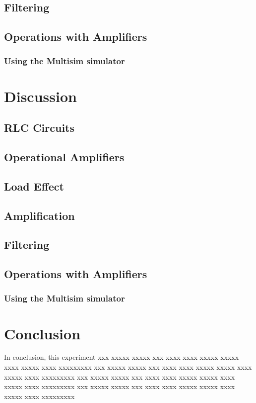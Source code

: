 \documentclass[12pt]{article}
\begin{document}
        \subsection{Filtering}
        \subsection{Operations with Amplifiers}
            \subsubsection{Using the Multisim simulator}


    \section{Discussion}
        \subsection{RLC Circuits}
        \subsection{Operational Amplifiers}
        \subsection{Load Effect}
        \subsection{Amplification}
        \subsection{Filtering}
        \subsection{Operations with Amplifiers}
            \subsubsection{Using the Multisim simulator}
    
    \section{Conclusion}
    In conclusion, this experiment 
    xxx xxxxx xxxxx xxx xxxx xxxx xxxxx xxxxx xxxx xxxxx xxxx
    xxxxxxxxx xxx xxxxx xxxxx xxx xxxx xxxx xxxxx xxxxx xxxx xxxxx xxxx xxxxxxxxx
    xxx xxxxx xxxxx xxx xxxx xxxx xxxxx xxxxx xxxx xxxxx xxxx xxxxxxxxx
    xxx xxxxx xxxxx xxx xxxx xxxx xxxxx xxxxx xxxx xxxxx xxxx xxxxxxxxx
\end{document}
